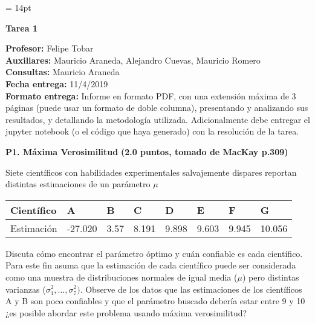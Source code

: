 \documentclass[11pt,letterpaper]{article}
\begin{document}
\pagestyle{fancy}
\fancyhf{}

\headheight = 14pt
\begin{center}
\large {\textbf{Tarea 1}}\\
\end{center}
\textbf{Profesor:} Felipe Tobar\\ 
\textbf{Auxiliares:} Mauricio Araneda, Alejandro Cuevas, Mauricio Romero \\
\textbf{Consultas:} Mauricio Araneda \\
\textbf{Fecha entrega:} 11/4/2019 \\

\noindent\textbf{Formato entrega:} Informe en formato PDF, con una extensión máxima de 3 páginas (puede usar un formato de doble columna), presentando y analizando sus resultados, y detallando la metodología utilizada. Adicionalmente debe entregar el jupyter notebook (o el código que haya generado) con la resolución de la tarea.

\vspace{5mm}

\noindent\textbf{P1. Máxima Verosimilitud} \textbf{(2.0 puntos, tomado de MacKay p.309)}
\vspace{5 mm}

Siete científicos con habilidades experimentales salvajemente dispares reportan distintas estimaciones de un parámetro $\mu$

\begin{table}[H]
\centering
\begin{tabular}{llllllll}
Científico & A       & B    & C     & D     & E     & F     & G      \\ \hline
Estimación & -27.020 & 3.57 & 8.191 & 9.898 & 9.603 & 9.945 & 10.056
\end{tabular}
\end{table}

Discuta cómo encontrar el parámetro óptimo y cuán confiable es cada científico. Para
este fin asuma que la estimación de cada científico puede ser considerada como una muestra de distribuciones normales de igual media ($\mu$) pero distintas varianzas ($\sigma_{1}^2 , \dots , \sigma_{7}^2 )$. Observe de los datos que las estimaciones de los científicos A y B son poco confiables y que el parámetro buscado debería estar entre 9 y 10 ¿es posible abordar este problema usando máxima verosimilitud?
\end{document}
